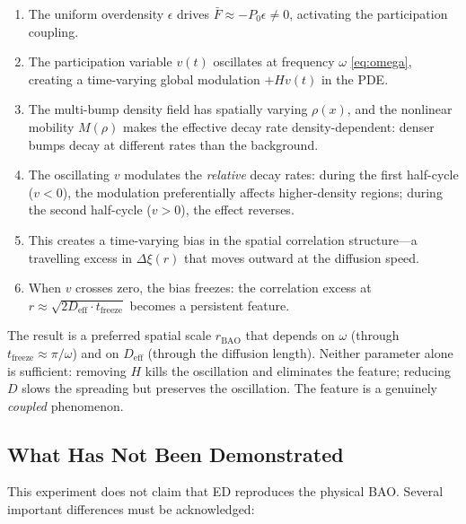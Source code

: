 \documentclass[11pt]{article}
\begin{document}
\begin{enumerate}
  \item The uniform overdensity \(\epsilon\) drives \(\bar{F} \approx -P_0 \epsilon \neq 0\), activating the participation coupling.
  \item The participation variable \(v(t)\) oscillates at frequency \(\omega\) \eqref{eq:omega}, creating a time-varying global modulation \(+Hv(t)\) in the PDE.
  \item The multi-bump density field has spatially varying \(\rho(x)\), and the nonlinear mobility \(M(\rho)\) makes the effective decay rate density-dependent: denser bumps decay at different rates than the background.
  \item The oscillating \(v\) modulates the \emph{relative} decay rates: during the first half-cycle (\(v < 0\)), the modulation preferentially affects higher-density regions; during the second half-cycle (\(v > 0\)), the effect reverses.
  \item This creates a time-varying bias in the spatial correlation structure---a travelling excess in \(\Delta\xi(r)\) that moves outward at the diffusion speed.
  \item When \(v\) crosses zero, the bias freezes: the correlation excess at \(r \approx \sqrt{2 D_{\mathrm{eff}} \cdot t_{\mathrm{freeze}}}\) becomes a persistent feature.
\end{enumerate}

The result is a preferred spatial scale \(r_{\mathrm{BAO}}\) that depends on \(\omega\) (through \(t_{\mathrm{freeze}} \approx \pi/\omega\)) and on \(D_{\mathrm{eff}}\) (through the diffusion length). Neither parameter alone is sufficient: removing \(H\) kills the oscillation and eliminates the feature; reducing \(D\) slows the spreading but preserves the oscillation. The feature is a genuinely \emph{coupled} phenomenon.

\subsection{What Has Not Been Demonstrated}

This experiment does not claim that ED reproduces the physical BAO. Several important differences must be acknowledged:
\end{document}
